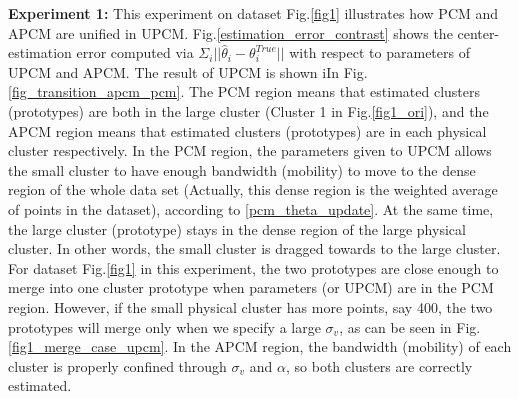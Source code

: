 \documentclass[journal]{IEEEtran}
\theoremstyle{definition}
\begin{document}
\textbf{Experiment 1:} This experiment on dataset Fig.\ref{fig1} illustrates how PCM and APCM are unified in UPCM.
Fig.\ref{estimation_error_contrast} shows the center-estimation error computed via $\Sigma_i||\hat{\theta}_i-\theta_i^{True}||$ with respect to parameters of UPCM and APCM. 
The result of UPCM is shown iIn Fig.\ref{fig_transition_apcm_pcm}. The PCM region means that estimated clusters (prototypes) are both in the large cluster (Cluster 1 in Fig.\ref{fig1_ori}), and the APCM region means that estimated clusters (prototypes) are in each physical cluster respectively.
In the PCM region, the parameters given to UPCM allows the small cluster to have enough bandwidth (mobility) to move to the dense region of the whole data set (Actually, this dense region is the weighted average of points in the dataset), according to \eqref{pcm_theta_update}. At the same time, the large cluster (prototype) stays in the dense region of the large physical cluster. In other words, the small cluster is dragged towards to the large cluster. For dataset Fig.\ref{fig1} in this experiment, the two prototypes are close enough to merge into one cluster prototype when parameters (or UPCM) are in the PCM region. However, if the small physical cluster has more points, say 400, the two prototypes will merge only when we specify a large $\sigma_v$, as can be seen in Fig.\ref{fig1_merge_case_upcm}.
In the APCM region, the bandwidth (mobility) of each cluster is properly confined through $\sigma_v$ and $\alpha$, so both clusters are correctly estimated.
\end{document}

